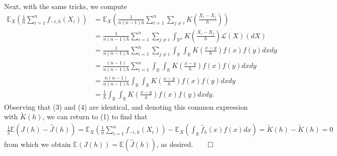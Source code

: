 \documentclass[10pt]{article}
\newcommand{\E}{\mathbb{E}}
\newcommand{\bp}[1]{\left({#1}\right)}
\newcommand{\mbb}[1]{\mathbb{#1}}
\newcommand{\1}[1]{\mathbbm{1}_{#1}}
\newcommand{\mc}[1]{\mathcal{#1}}
\begin{document}
    Next, with the same tricks, we compute
    \begin{align*}
        \E_X\bp{\frac{1}{n}\sum_{i=1}^nf_{-i,h}(X_i)}&=\E_X\bp{\frac{1}{n(n-1)h}\sum_{i=1}^n\sum_{j\neq i}K\bp{\frac{X_i-X_j}{h}}}\\
        &=\frac{1}{n(n-1)h}\sum_{i=1}^n\sum_{j\neq i}\int_{\mbb{R}^n}K\bp{\frac{X_i-X_j}{h}}\mc{L}(X)(dX)\\
        &=\frac{1}{n(n-1)h}\sum_{i=1}^n\sum_{j\neq i}\int_\mbb{R}\int_\mbb{R}K\bp{\frac{x-y}{h}}f(x)f(y)dxdy\\
        &=\frac{(n-1)}{n(n-1)h}\sum_{i=1}^n\int_\mbb{R}\int_\mbb{R}K\bp{\frac{x-y}{h}}f(x)f(y)dxdy\\
        &=\frac{n(n-1)}{n(n-1)h}\int_\mbb{R}\int_\mbb{R}K\bp{\frac{x-y}{h}}f(x)f(y)dxdy\\
        &=\frac{1}{h}\int_\mbb{R}\int_\mbb{R}K\bp{\frac{x-y}{h}}f(x)f(y)dxdy.\tag{4}
    \end{align*} 
    Observing that (3) and (4) are identical, and denoting this common expression with $\tilde{K}(h)$, we can return to (1) to find that
    \begin{align*}
        \frac{1}{2}\E\bp{J(h)-\hat{J}(h)}=\E_X\bp{\frac{1}{n}\sum_{i=1}^nf_{-i,h}(X_i)}-\E_X\bp{\int_\mbb{R}\hat{f}_h(x)f(x)dx}=\tilde{K}(h)-\tilde{K}(h)=0
    \end{align*}
    from which we obtain $\E(J(h))=\E(\hat{J}(h))$, as desired.\hfill{$\qed$}\\[5pt]
\end{document}
